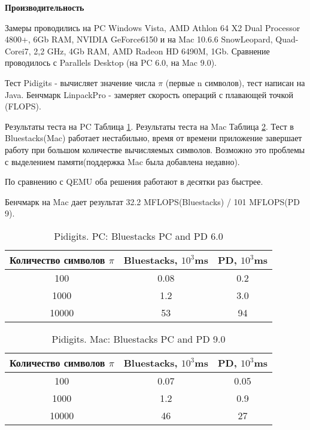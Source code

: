 {\bf Производительность}

Замеры проводились на PC Windows Vista, AMD Athlon 64 X2 Dual Processor 4800+, 6Gb RAM, NVIDIA GeForce6150 и на Mac 10.6.6 SnowLeopard, Quad-Corei7, 2,2 GHz, 4Gb RAM, AMD Radeon HD 6490M, 1Gb. Сравнение проводилось с Parallels Desktop (на PC 6.0, на Mac 9.0).

Тест Pidigits - вычисляет значение числа ${\pi}$ (первые n символов), тест написан на Java.
Бенчмарк LinpackPro - замеряет скорость операций с плавающей точкой (FLOPS).

Результаты теста на PC Таблица \ref{tab:pc_pidigits}.
Результаты теста на Mac Таблица \ref{tab:mac_pidigits}. Тест в Bluestacks(Mac) работает нестабильно, время от времени приложение завершает работу при большом количестве вычисляемых символов. Возможно это проблемы с выделением памяти(поддержка Mac была добавлена недавно).

По сравнению с QEMU оба решения работают в десятки раз быстрее.

Бенчмарк на Mac дает результат 32.2 MFLOPS(Bluestacks) / 101 MFLOPS(PD 9).

\begin{table}[h]
\caption{\label{tab:pc_pidigits} Pidigits. PC: Bluestacks PC and PD 6.0}
\begin{center}
\begin{tabular} {|c|c|c|}
\hline
Количество символов $\pi$ & Bluestacks, $10^3$ms & PD, $10^3$ms \\
\hline
100 & 0.08 & 0.2 \\
\hline
1000 & 1.2 & 3.0 \\
\hline
10000 & 53 & 94 \\
\hline
\end{tabular}
\end{center}
\end{table}


\begin{table}[h]
\caption{\label{tab:mac_pidigits} Pidigits. Mac: Bluestacks PC and PD 9.0}
\begin{center}
\begin{tabular} {|c|c|c|}
\hline
Количество символов $\pi$ & Bluestacks, $10^3$ms & PD, $10^3$ms \\
\hline
100 & 0.07 & 0.05 \\
\hline
1000 & 1.2 & 0.9 \\
\hline
10000 & 46 & 27 \\
\hline
\end{tabular}
\end{center}
\end{table}


